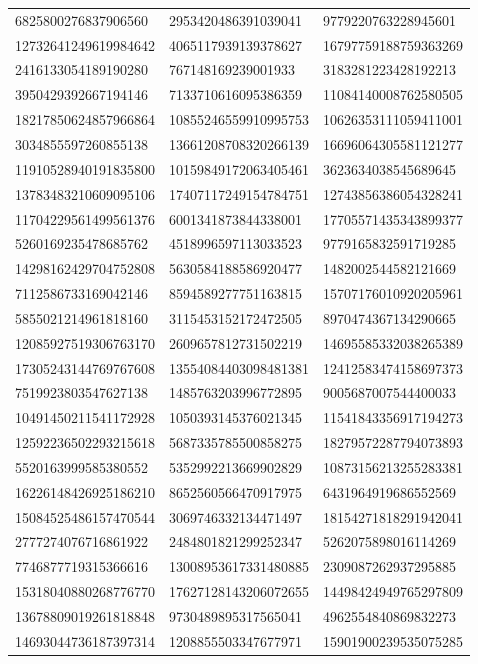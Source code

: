 \begin{longtable}{*{3}{l}}
6825800276837906560&2953420486391039041&9779220763228945601\\
12732641249619984642&4065117939139378627&16797759188759363269\\
2416133054189190280&767148169239001933&3183281223428192213\\
3950429392667194146&7133710616095386359&11084140008762580505\\
18217850624857966864&10855246559910995753&10626353111059411001\\
3034855597260855138&13661208708320266139&16696064305581121277\\
11910528940191835800&10159849172063405461&3623634038545689645\\
13783483210609095106&17407117249154784751&12743856386054328241\\
11704229561499561376&6001341873844338001&17705571435343899377\\
5260169235478685762&4518996597113033523&9779165832591719285\\
14298162429704752808&5630584188586920477&1482002544582121669\\
7112586733169042146&8594589277751163815&15707176010920205961\\
5855021214961818160&3115453152172472505&8970474367134290665\\
12085927519306763170&2609657812731502219&14695585332038265389\\
17305243144769767608&13554084403098481381&12412583474158697373\\
7519923803547627138&1485763203996772895&9005687007544400033\\
10491450211541172928&1050393145376021345&11541843356917194273\\
12592236502293215618&5687335785500858275&18279572287794073893\\
5520163999585380552&5352992213669902829&10873156213255283381\\
16226148426925186210&8652560566470917975&6431964919686552569\\
15084525486157470544&3069746332134471497&18154271818291942041\\
2777274076716861922&2484801821299252347&5262075898016114269\\
7746877719315366616&13008953617331480885&2309087262937295885\\
15318040880268776770&17627128143206072655&14498424949765297809\\
13678809019261818848&9730489895317565041&4962554840869832273\\
14693044736187397314&1208855503347677971&15901900239535075285\\

\end{longtable}
